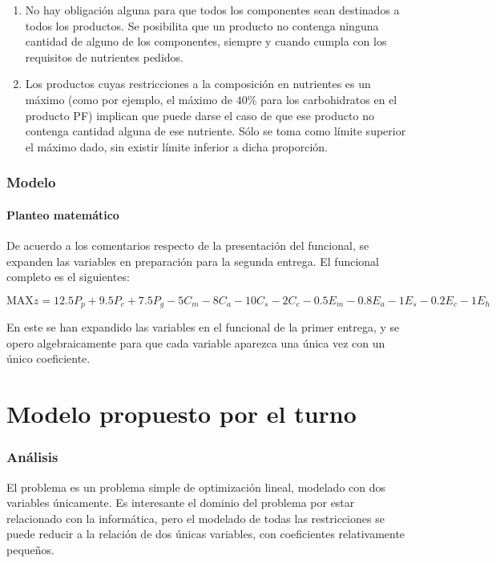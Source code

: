 \documentclass[a4paper,11pt]{article}
\begin{document}
\begin{enumerate}

  \item No hay obligación alguna para que todos los componentes sean destinados
    a todos los productos. Se posibilita que un producto no contenga ninguna
    cantidad de alguno de los componentes, siempre y cuando cumpla con los
    requisitos de nutrientes pedidos.

   \item Los productos cuyas restricciones a la composición en nutrientes es un
     máximo (como por ejemplo, el máximo de \(40\%\) para los carbohidratos en
     el producto PF) implican que puede darse el caso de que ese producto no
     contenga cantidad alguna de ese nutriente. Sólo se toma como límite
     superior el máximo dado, sin existir límite inferior a dicha proporción.

\end{enumerate}

\section{Modelo}

\subsection{Planteo matemático}

De acuerdo a los comentarios respecto de la presentación del funcional, se
expanden las variables en preparación para la segunda entrega. El funcional
completo es el siguientes:

\[
  \text{MAX} z = 12.5 P_p + 9.5 P_c + 7.5 P_g - 5 C_m - 8 C_a - 10 C_s - 2 C_c - 0.5 E_m - 0.8 E_a - 1 E_s - 0.2 E_c - 1 E_h
\]

En este se han expandido las variables en el funcional de la primer entrega, y
se opero algebraicamente para que cada variable aparezca una única vez con un
único coeficiente.

\part{Modelo propuesto por el turno}

\section{Análisis}

El problema es un problema simple de optimización lineal, modelado con dos
variables únicamente. Es interesante el dominio del problema por estar
relacionado con la informática, pero el modelado de todas las restricciones se
puede reducir a la relación de dos únicas variables, con coeficientes
relativamente pequeños.
\end{document}
